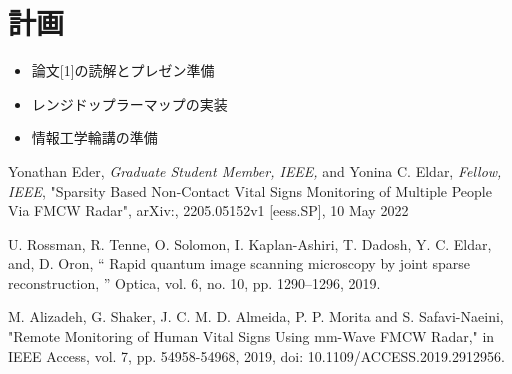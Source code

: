 \documentclass[dvipdfmx]{jsarticle}
\begin{document}
\section{計画}
\begin{itemize}
    \item 論文[1]の読解とプレゼン準備
    \item レンジドップラーマップの実装
    \item 情報工学輪講の準備
\end{itemize}


\begin{thebibliography}{}
\item Yonathan Eder, \textit{Graduate Student Member, IEEE, }and Yonina C. Eldar, \textit{Fellow, IEEE}, "Sparsity Based Non-Contact Vital Signs Monitoring of Multiple People Via FMCW Radar", arXiv:, 2205.05152v1 [eess.SP], 10 May 2022
\item U. Rossman, R. Tenne, O. Solomon, I. Kaplan-Ashiri, T. Dadosh, Y. C. Eldar, and, D. Oron,
“ Rapid quantum image scanning microscopy by joint sparse reconstruction, ” Optica, vol. 6,
no. 10, pp. 1290–1296, 2019.
\item  M. Alizadeh, G. Shaker, J. C. M. D. Almeida, P. P. Morita and S. Safavi-Naeini, "Remote Monitoring of Human Vital Signs Using mm-Wave FMCW Radar," in IEEE Access, vol. 7, pp. 54958-54968, 2019, doi: 10.1109/ACCESS.2019.2912956.
\end{thebibliography}
\end{document}

